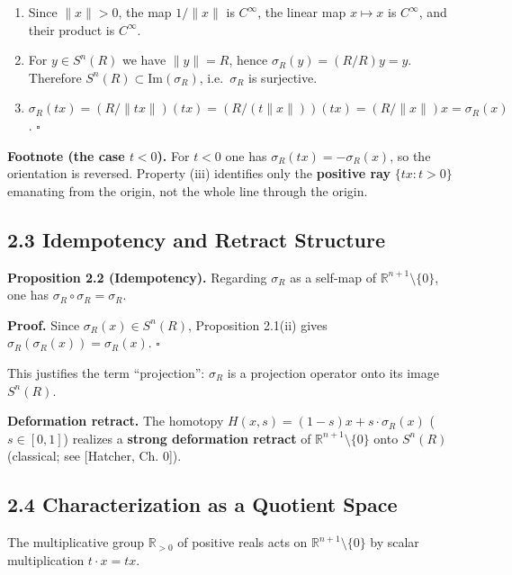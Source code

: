 \documentclass[
]{ltjsarticle}
\begin{document}
\begin{enumerate}
\def\labelenumi{(\roman{enumi})}
\item
  Since \(\|x\| > 0\), the map \(1/\|x\|\) is \(C^\infty\), the linear
  map \(x \mapsto x\) is \(C^\infty\), and their product is
  \(C^\infty\).
\item
  For \(y \in S^n(R)\) we have \(\|y\| = R\), hence
  \(\sigma_R(y) = (R/R) y = y\). Therefore
  \(S^n(R) \subset \mathrm{Im}(\sigma_R)\), i.e.~\(\sigma_R\) is
  surjective.
\item
  \(\sigma_R(tx) = (R/\|tx\|)(tx) = (R/(t\|x\|))(tx) = (R/\|x\|) x = \sigma_R(x)\).
  \(\square\)
\end{enumerate}

\textbf{Footnote (the case \(t < 0\)).} For \(t < 0\) one has
\(\sigma_R(tx) = -\sigma_R(x)\), so the orientation is reversed.
Property (iii) identifies only the \textbf{positive ray}
\(\{tx : t > 0\}\) emanating from the origin, not the whole line through
the origin.

\subsection{2.3 Idempotency and Retract
Structure}\label{idempotency-and-retract-structure}

\textbf{Proposition 2.2 (Idempotency).} Regarding \(\sigma_R\) as a
self-map of \(\mathbb{R}^{n+1} \setminus \{0\}\), one has
\(\sigma_R \circ \sigma_R = \sigma_R\).

\textbf{Proof.} Since \(\sigma_R(x) \in S^n(R)\), Proposition 2.1(ii)
gives \(\sigma_R(\sigma_R(x)) = \sigma_R(x)\). \(\square\)

This justifies the term ``projection'': \(\sigma_R\) is a projection
operator onto its image \(S^n(R)\).

\textbf{Deformation retract.} The homotopy
\(H(x, s) = (1-s) x + s \cdot \sigma_R(x)\) (\(s \in [0, 1]\)) realizes
a \textbf{strong deformation retract} of
\(\mathbb{R}^{n+1} \setminus \{0\}\) onto \(S^n(R)\) (classical; see
{[}Hatcher, Ch. 0{]}).

\subsection{2.4 Characterization as a Quotient
Space}\label{characterization-as-a-quotient-space}

The multiplicative group \(\mathbb{R}_{>0}\) of positive reals acts on
\(\mathbb{R}^{n+1} \setminus \{0\}\) by scalar multiplication
\(t \cdot x = tx\).
\end{document}

